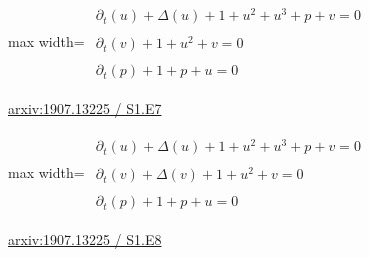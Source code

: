 \documentclass[10pt,a4paper]{article}
\begin{document}
\begin{minipage}{\linewidth}
\begin{center}\begin{adjustbox}{max width=\linewidth}$\displaystyle\begin{gathered}\begin{gathered}\partial_{t}(u)+\Delta(u)+1+u^{2}+u^{3}+p+v=0\end{gathered}\\[5pt]\begin{gathered}\partial_{t}(v)+1+u^{2}+v=0\end{gathered}\\[5pt]\begin{gathered}\partial_{t}(p)+1+p+u=0\end{gathered}\end{gathered}$\end{adjustbox}\end{center}
{\small \href{https://arxiv.org/html/1907.13225#S1.E7}{arxiv:1907.13225 / S1.E7}}\par
\end{minipage}\par\vspace{7mm}

\begin{minipage}{\linewidth}
\begin{center}\begin{adjustbox}{max width=\linewidth}$\displaystyle\begin{gathered}\begin{gathered}\partial_{t}(u)+\Delta(u)+1+u^{2}+u^{3}+p+v=0\end{gathered}\\[5pt]\begin{gathered}\partial_{t}(v)+\Delta(v)+1+u^{2}+v=0\end{gathered}\\[5pt]\begin{gathered}\partial_{t}(p)+1+p+u=0\end{gathered}\end{gathered}$\end{adjustbox}\end{center}
{\small \href{https://arxiv.org/html/1907.13225#S1.E8}{arxiv:1907.13225 / S1.E8}}\par
\end{minipage}\par\vspace{7mm}
\end{document}
